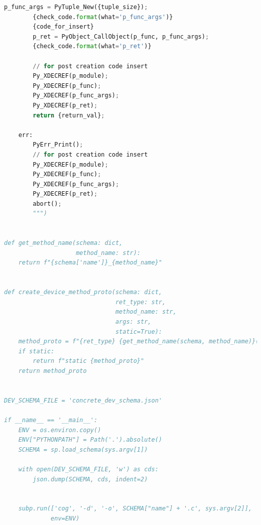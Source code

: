 \begin{lstlisting}[language={Python},basicstyle=\tiny,stepnumber=1,caption={Вспомогательные методы кодогенерации},label={lst:main.py}]
        p_func_args = PyTuple_New({tuple_size});
        {check_code.format(what='p_func_args')}
        {code_for_insert}
        p_ret = PyObject_CallObject(p_func, p_func_args);
        {check_code.format(what='p_ret')}

        // for post creation code insert
        Py_XDECREF(p_module);
        Py_XDECREF(p_func);
        Py_XDECREF(p_func_args);
        Py_XDECREF(p_ret);
        return {return_val};

    err:
        PyErr_Print();
        // for post creation code insert
        Py_XDECREF(p_module);
        Py_XDECREF(p_func);
        Py_XDECREF(p_func_args);
        Py_XDECREF(p_ret);
        abort();
        """)


def get_method_name(schema: dict,
                    method_name: str):
    return f"{schema['name']}_{method_name}"


def create_device_method_proto(schema: dict,
                               ret_type: str,
                               method_name: str,
                               args: str,
                               static=True):
    method_proto = f"{ret_type} {get_method_name(schema, method_name)}({args})"
    if static:
        return f"static {method_proto}"
    return method_proto


DEV_SCHEMA_FILE = 'concrete_dev_schema.json'

if __name__ == '__main__':
    ENV = os.environ.copy()
    ENV["PYTHONPATH"] = Path('.').absolute()
    SCHEMA = sp.load_schema(sys.argv[1])

    with open(DEV_SCHEMA_FILE, 'w') as cds:
        json.dump(SCHEMA, cds, indent=2)


    subp.run(['cog', '-d', '-o', SCHEMA["name"] + '.c', sys.argv[2]],
             env=ENV)
\end{lstlisting}


